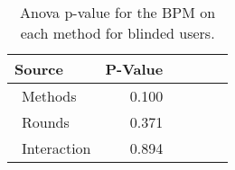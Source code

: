 
\begin{table}[H]
\centering
\caption{Anova p-value for the BPM on each method for blinded users.}
\label{tab:blocanova_bpm_two_way_blind}
\begin{tabular}{lrrrrr}
\toprule
          Source & P-Value \\
\midrule
    \    Methods &   0.100 \\
     \    Rounds &   0.371 \\
\    Interaction &   0.894 \\
\bottomrule
\end{tabular}
\end{table}

